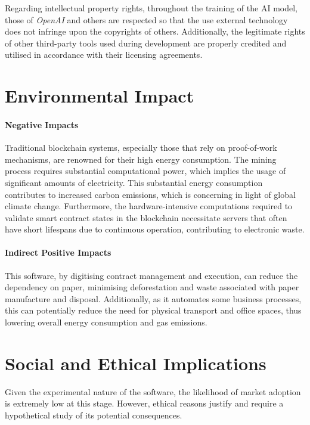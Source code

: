 Regarding intellectual property rights, throughout the training of the AI model, those of \textit{OpenAI} and others are respected so that the use external technology does not infringe upon the copyrights of others. Additionally, the legitimate rights of other third-party tools used during development are properly credited and utilised in accordance with their licensing agreements.

\section{Environmental Impact}

\paragraph{Negative Impacts}

Traditional blockchain systems, especially those that rely on proof-of-work mechanisms, are renowned for their high energy consumption. The mining process requires substantial computational power, which implies the usage of significant amounts of electricity. This substantial energy consumption contributes to increased carbon emissions, which is concerning in light of global climate change. Furthermore, the hardware-intensive computations required to validate smart contract states in the blockchain necessitate servers that often have short lifespans due to continuous operation, contributing to electronic waste.

\paragraph{Indirect Positive Impacts}

This software, by digitising contract management and execution, can reduce the dependency on paper, minimising deforestation and waste associated with paper manufacture and disposal. Additionally, as it automates some business processes, this can potentially reduce the need for physical transport and office spaces, thus lowering overall energy consumption and gas emissions.

\section{Social and Ethical Implications}

Given the experimental nature of the software, the likelihood of market adoption is extremely low at this stage. However, ethical reasons justify and require a hypothetical study of its potential consequences.


